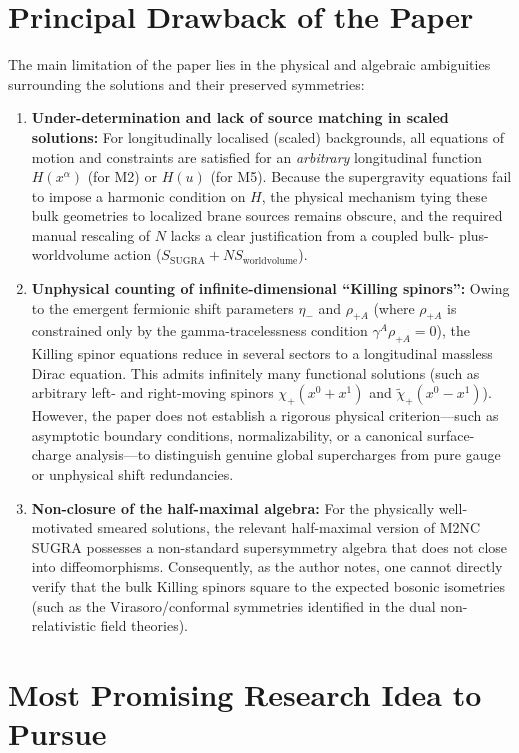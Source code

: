 \documentclass[11pt,a4paper]{article}
\begin{document}
\section{Principal Drawback of the Paper}

The main limitation of the paper lies in the physical and algebraic ambiguities surrounding the solutions and their preserved symmetries:
\begin{enumerate}
    \item \textbf{Under-determination and lack of source matching in scaled solutions:} For longitudinally localised (scaled) backgrounds, all equations of motion and constraints are satisfied for an \emph{arbitrary} longitudinal function $H(x^\alpha)$ (for M2) or $H(u)$ (for M5). Because the supergravity equations fail to impose a harmonic condition on $H$, the physical mechanism tying these bulk geometries to localized brane sources remains obscure, and the required manual rescaling of $N$ lacks a clear justification from a coupled bulk- plus-worldvolume action ($S_{\text{SUGRA}} + N S_{\text{worldvolume}}$).
    \item \textbf{Unphysical counting of infinite-dimensional ``Killing spinors'':} Owing to the emergent fermionic shift parameters $\eta_-$ and $\rho_{+A}$ (where $\rho_{+A}$ is constrained only by the gamma-tracelessness condition $\gamma^A \rho_{+A} = 0$), the Killing spinor equations reduce in several sectors to a longitudinal massless Dirac equation. This admits infinitely many functional solutions (such as arbitrary left- and right-moving spinors $\chi_+(x^0+x^1)$ and $\tilde{\chi}_+(x^0-x^1)$). However, the paper does not establish a rigorous physical criterion---such as asymptotic boundary conditions, normalizability, or a canonical surface-charge analysis---to distinguish genuine global supercharges from pure gauge or unphysical shift redundancies.
    \item \textbf{Non-closure of the half-maximal algebra:} For the physically well-motivated smeared solutions, the relevant half-maximal version of M2NC SUGRA possesses a non-standard supersymmetry algebra that does not close into diffeomorphisms. Consequently, as the author notes, one cannot directly verify that the bulk Killing spinors square to the expected bosonic isometries (such as the Virasoro/conformal symmetries identified in the dual non-relativistic field theories).
\end{enumerate}

\section{Most Promising Research Idea to Pursue}
\end{document}
